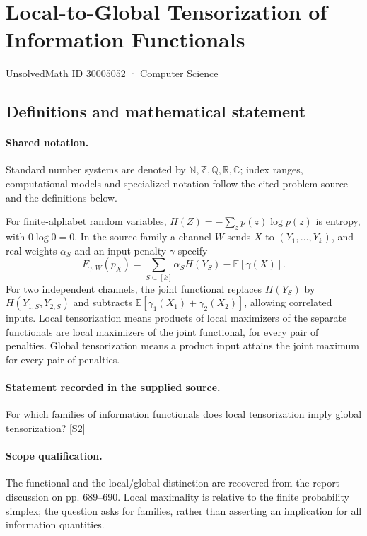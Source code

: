 \documentclass[11pt]{article}
\newcommand{\sref}[2]{\hyperlink{source:#1:#2}{[S#2]}}
\begin{document}
\setcounter{section}{30005051}
\section{Local-to-Global Tensorization of Information Functionals}\label{30005052}
{\small\sffamily UnsolvedMath ID 30005052 · Computer Science}
\subsection{Definitions and mathematical statement}

\paragraph{Shared notation.}Standard number systems are denoted by $\mathbb N,\mathbb Z,\mathbb Q,\mathbb R,\mathbb C$; index ranges, computational models and specialized notation follow the cited problem source and the definitions below.


For finite-alphabet random variables, $H(Z)=-\sum_z p(z)\log p(z)$ is entropy, with $0\log0=0$. In the source family a channel $W$ sends $X$ to $(Y_1,\ldots,Y_k)$, and real weights $\alpha_S$ and an input penalty $\gamma$ specify
\[F_{\gamma,W}(p_X)=\sum_{S\subseteq[k]}\alpha_S H(Y_S)-\mathbb E[\gamma(X)].\]
For two independent channels, the joint functional replaces $H(Y_S)$ by $H(Y_{1,S},Y_{2,S})$ and subtracts $\mathbb E[\gamma_1(X_1)+\gamma_2(X_2)]$, allowing correlated inputs. Local tensorization means products of local maximizers of the separate functionals are local maximizers of the joint functional, for every pair of penalties. Global tensorization means a product input attains the joint maximum for every pair of penalties.
\paragraph{Statement recorded in the supplied source.}
For which families of information functionals does local tensorization imply global tensorization? \sref{30005052}{2}
\paragraph{Scope qualification.}
The functional and the local/global distinction are recovered from the report discussion on pp. 689--690. Local maximality is relative to the finite probability simplex; the question asks for families, rather than asserting an implication for all information quantities.
\end{document}
